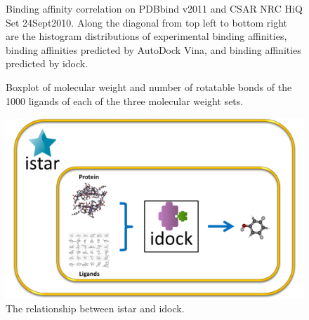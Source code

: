 \documentclass[12pt]{article}
\begin{document}
\begin{figure}
\caption{\label{FECorrelation} Binding affinity correlation on PDBbind v2011 and CSAR NRC HiQ Set 24Sept2010. Along the diagonal from top left to bottom right are the histogram distributions of experimental binding affinities, binding affinities predicted by AutoDock Vina, and binding affinities predicted by idock.}
\end{figure}

\begin{figure}
\caption{\label{MWT-NRB} Boxplot of molecular weight and number of rotatable bonds of the 1000 ligands of each of the three molecular weight sets.}
\end{figure}


\fi


\clearpage

\begin{figure}
\begin{center}
\includegraphics[width=\linewidth,keepaspectratio=true]{Relationship.png}
\caption{\label{relationship} The relationship between istar and idock.}
\end{center}
\end{figure}

\clearpage
\end{document}
